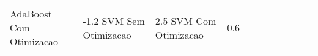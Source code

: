\begin{table}[H]
\begin{adjustwidth}{ -1in }{ -1in }
\begin{tabular}{lllllllllll}
           AdaBoost Com Otimizacao &      -1.2%
                SVM Sem Otimizacao &       2.5%
                SVM Com Otimizacao &       0.6%
\bottomrule
\end{tabular}
    \end{adjustwidth}
    \renewcommand{\arraystretch}{1.0} %
\end{table}
